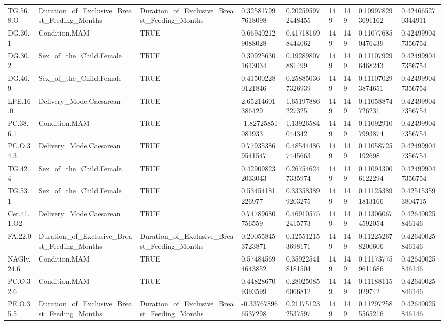 \begin{longtable}{lllllllll}
TG.56.8.O & Duration\_of\_Exclusive\_Breast\_Feeding\_Months & Duration\_of\_Exclusive\_Breast\_Feeding\_Months & 0.325817997618098 & 0.202595972448455 & 149 & 149 & 0.109978293691162 & 0.424665270344911 \\
DG.30.1 & Condition.MAM & TRUE & 0.669402129088028 & 0.417181698444062 & 149 & 149 & 0.110776850476439 & 0.424999047356754 \\
DG.30.2 & Sex\_of\_the\_Child.Female & TRUE & 0.309256301613034 & 0.19289807881499 & 149 & 149 & 0.111079296468243 & 0.424999047356754 \\
DG.46.9 & Sex\_of\_the\_Child.Female & TRUE & 0.415002280121846 & 0.258850367326939 & 149 & 149 & 0.111070293874651 & 0.424999047356754 \\
LPE.16.0 & Delivery\_Mode.Caesarean & TRUE & 2.65214601386429 & 1.65197886227325 & 149 & 149 & 0.11058874726231 & 0.424999047356754 \\
PC.38.6.1 & Condition.MAM & TRUE & -1.82725851081933 & 1.13926584044342 & 149 & 149 & 0.110929107993874 & 0.424999047356754 \\
PC.O.34.3 & Delivery\_Mode.Caesarean & TRUE & 0.779353869541547 & 0.485444867445663 & 149 & 149 & 0.11058725192698 & 0.424999047356754 \\
TG.42.4 & Sex\_of\_the\_Child.Female & TRUE & 0.429098232033043 & 0.267546247335974 & 149 & 149 & 0.110943006122294 & 0.424999047356754 \\
TG.53.1 & Sex\_of\_the\_Child.Female & TRUE & 0.53454181226977 & 0.333583899203275 & 149 & 149 & 0.111253891813166 & 0.425153593804715 \\
Cer.41.1.O2 & Delivery\_Mode.Caesarean & TRUE & 0.74789680756559 & 0.469105752415773 & 149 & 149 & 0.113060674592054 & 0.42640025846146 \\
FA.22.0 & Duration\_of\_Exclusive\_Breast\_Feeding\_Months & Duration\_of\_Exclusive\_Breast\_Feeding\_Months & 0.200558453723871 & 0.125512153698171 & 149 & 149 & 0.112252678200606 & 0.42640025846146 \\
NAGly.24.6 & Condition.MAM & TRUE & 0.574845694643852 & 0.359225418181504 & 149 & 149 & 0.111737759611686 & 0.42640025846146 \\
PC.O.32.6 & Condition.MAM & TRUE & 0.448286709393599 & 0.280250856066812 & 149 & 149 & 0.11188115029742 & 0.42640025846146 \\
PE.O.35.5 & Duration\_of\_Exclusive\_Breast\_Feeding\_Months & Duration\_of\_Exclusive\_Breast\_Feeding\_Months & -0.337678966537298 & 0.211751232537597 & 149 & 149 & 0.112972585565216 & 0.42640025846146 \\

\end{longtable}
